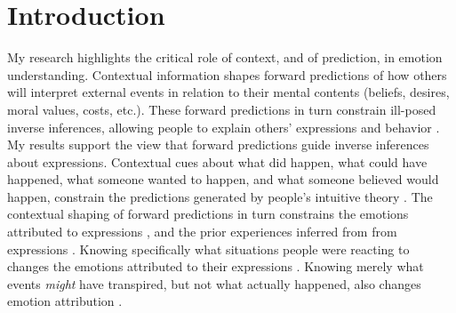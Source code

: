 \section{Introduction}

My research highlights the critical role of context, and of prediction, in emotion understanding. Contextual information shapes forward predictions of how others will interpret external events in relation to their mental contents (beliefs, desires, moral values, costs, etc.). These forward predictions in turn constrain ill-posed inverse inferences, allowing people to explain others' expressions and behavior \citep{saxe2017cop}. My results support the view that forward predictions guide inverse inferences about expressions. Contextual cues about what did happen, what could have happened, what someone wanted to happen, and what someone believed would happen, constrain the predictions generated by people's intuitive theory \citep{houlihan2018cogsci}. The contextual shaping of forward predictions in turn constrains the emotions attributed to expressions \citep{anzellotti2021emotion}, and the prior experiences inferred from from expressions \citep{houlihan2022emotionreasoning}. Knowing specifically what situations people were reacting to changes the emotions attributed to their expressions \citep{anzellotti2021emotion, houlihan2022thesis}. Knowing merely what events \emph{might} have transpired, but not what actually happened, also changes emotion attribution \citep{houlihan2022emotionreasoning, anzellotti2021emotion}.

